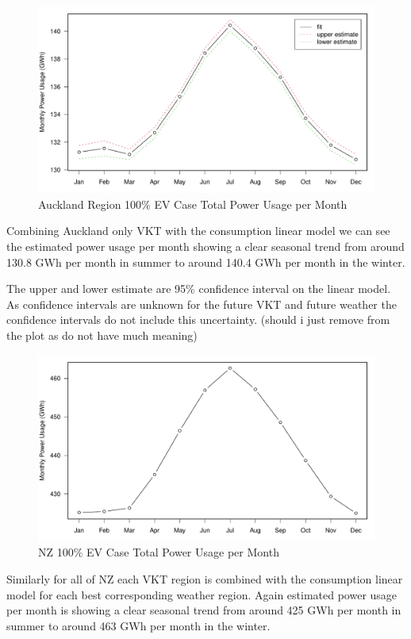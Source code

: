 \documentclass[
]{article}
\begin{document}
\begin{figure}
\centering
\includegraphics{summary_week4_files/figure-latex/Auckland_power-1.pdf}
\caption{Auckland Region 100\% EV Case Total Power Usage per Month}
\end{figure}

Combining Auckland only VKT with the consumption linear model we can see
the estimated power usage per month showing a clear seasonal trend from
around 130.8 GWh per month in summer to around 140.4 GWh per month in
the winter.

The upper and lower estimate are 95\% confidence interval on the linear
model. As confidence intervals are unknown for the future VKT and future
weather the confidence intervals do not include this uncertainty.
(should i just remove from the plot as do not have much meaning)

\begin{figure}
\centering
\includegraphics{summary_week4_files/figure-latex/NZ_power-1.pdf}
\caption{NZ 100\% EV Case Total Power Usage per Month}
\end{figure}

Similarly for all of NZ each VKT region is combined with the consumption
linear model for each best corresponding weather region. Again estimated
power usage per month is showing a clear seasonal trend from around 425
GWh per month in summer to around 463 GWh per month in the winter.
\end{document}
